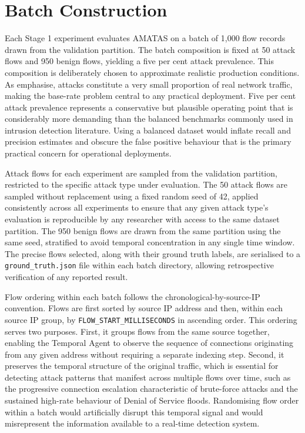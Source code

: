 \documentclass[../main.tex]{subfiles}
\begin{document}
\section{Batch Construction}
\label{sec:batch-construction}

Each Stage 1 experiment evaluates AMATAS on a batch of 1,000 flow records drawn from the validation partition. The batch composition is fixed at 50 attack flows and 950 benign flows, yielding a five per cent attack prevalence. This composition is deliberately chosen to approximate realistic production conditions. As \textcite{Sommer2010} emphasise, attacks constitute a very small proportion of real network traffic, making the base-rate problem central to any practical deployment. Five per cent attack prevalence represents a conservative but plausible operating point that is considerably more demanding than the balanced benchmarks commonly used in intrusion detection literature. Using a balanced dataset would inflate recall and precision estimates and obscure the false positive behaviour that is the primary practical concern for operational deployments.

Attack flows for each experiment are sampled from the validation partition, restricted to the specific attack type under evaluation. The 50 attack flows are sampled without replacement using a fixed random seed of 42, applied consistently across all experiments to ensure that any given attack type's evaluation is reproducible by any researcher with access to the same dataset partition. The 950 benign flows are drawn from the same partition using the same seed, stratified to avoid temporal concentration in any single time window. The precise flows selected, along with their ground truth labels, are serialised to a \texttt{ground\_truth.json} file within each batch directory, allowing retrospective verification of any reported result.

Flow ordering within each batch follows the chronological-by-source-IP convention. Flows are first sorted by source IP address and then, within each source IP group, by \texttt{FLOW\_START\_MILLISECONDS} in ascending order. This ordering serves two purposes. First, it groups flows from the same source together, enabling the Temporal Agent to observe the sequence of connections originating from any given address without requiring a separate indexing step. Second, it preserves the temporal structure of the original traffic, which is essential for detecting attack patterns that manifest across multiple flows over time, such as the progressive connection escalation characteristic of brute-force attacks and the sustained high-rate behaviour of Denial of Service floods. Randomising flow order within a batch would artificially disrupt this temporal signal and would misrepresent the information available to a real-time detection system.
\end{document}
